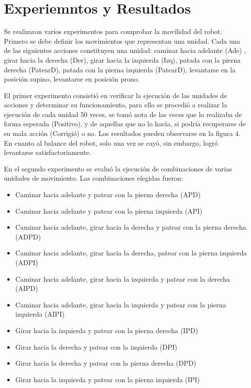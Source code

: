 \chapter{Experiemntos y Resultados}\label{chapter:resultados}

Se realizaron varios experimentos para comprobar la movilidad del robot. Primero se debe definir los movimientos que representan una unidad. Cada una de las siguientes acciones constituyen una unidad: caminar hacia adelante (Ade) , girar hacia la derecha (Der), girar hacia la izquierda (Izq), patada con la pierna derecha (PatearD), patada con la pierna izquierda (PatearD), levantarse en la posición supino, levantarse en posición prono.

El primer experimento consistió en verificar la ejecución de las unidades de acciones y determinar su funcionamiento, para ello se procedió a realizar la ejecución de cada unidad 50 veces, se tomó nota de las veces que lo realizaba de forma esperada (Positivo), y de aquellas que no lo hacía, si podría recuperarse de su mala acción (Corrigió) o no. Los resultados pueden observarse en la figura 4. En cuanto al balance del robot,  solo una vez se cayó, sin embargo, logró levantarse satisfactoriamente.

En el segundo experimento se evalu\'o la ejecuci\'on de  combinaciones de varias unidades de movimiento. Las combinaciones elegidas fueron:

\begin{itemize}
\setlength{\itemsep}{1pt}
\item Caminar hacia adelante y patear con la pierna derecha (APD)
\item Caminar hacia adelante y patear con la pierna izquierda (API)
\item Caminar hacia adelante, girar hacia la derecha y patear con la pierna derecha (ADPD)
\item Caminar hacia adelante, girar hacia la derecha, patear con la pierna izquierda (ADPI)
\item Caminar hacia adelante, girar hacia la izquierda y patear con la derecha (AIPD)
\item Caminar hacia adelante, girar hacia la  izquierda y  patear con la pierna izquierda (AIPI)
\item Girar hacia la izquierda y patear con la pierna derecha (IPD)
\item Girar hacia la derecha y patear con la izquierda (DPI)
\item Girar hacia la derecha y patear con la pierna derecha (DPD)
\item Girar hacia la izquierda y patear con la pierna izquierda (IPI)
\end{itemize}


